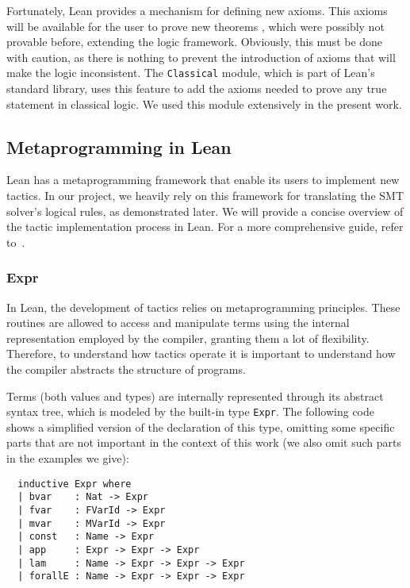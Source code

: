 Fortunately, Lean provides a mechanism for defining new axioms. This axioms will be available for the user to prove new theorems
, which were possibly not provable before, extending the logic framework. Obviously, this must be done with caution, as
there is nothing to prevent the introduction of axioms that will make the logic inconsistent.
The \texttt{Classical} module, which is part of Lean's standard library, uses this feature to add the axioms needed to prove
any true statement in classical logic. We used this module extensively in the present work.

\subsection{Metaprogramming in Lean}\label{sec:metaLean}

Lean has a metaprogramming framework that enable its users to implement new tactics. In our project, we heavily rely on this framework for translating the SMT solver's logical rules, as demonstrated later. We will provide a concise overview of the tactic implementation process in Lean. For a more comprehensive guide, refer to~\cite{metaLean}.

\subsubsection{Expr}

In Lean, the development of tactics relies on metaprogramming principles. These routines are allowed to access and manipulate terms using the internal representation employed by the compiler, granting them a lot of flexibility. Therefore, to understand how tactics operate it is important to understand how the compiler abstracts the structure of programs.

Terms (both values and types) are internally represented through its abstract syntax tree, which is modeled by the built-in type \texttt{Expr}. The following code shows a simplified version of the declaration of this type, omitting some specific parts that are not important in the context of this work (we also omit such parts in the examples we give):

\begin{verbatim}
  inductive Expr where
  | bvar    : Nat -> Expr
  | fvar    : FVarId -> Expr
  | mvar    : MVarId -> Expr
  | const   : Name -> Expr
  | app     : Expr -> Expr -> Expr
  | lam     : Name -> Expr -> Expr -> Expr
  | forallE : Name -> Expr -> Expr -> Expr
\end{verbatim}

